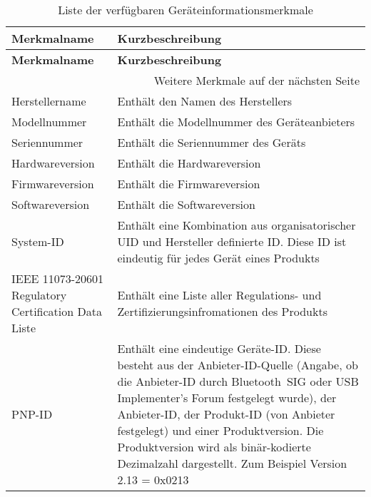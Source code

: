 \begin{longtable}[c]{|p{4cm}|p{11cm}|}
    \caption{Liste der verfügbaren Geräteinformationsmerkmale}
    \label{table:deviceinformationlist}\\
    \hline
    \textbf{Merkmalname} & \textbf{Kurzbeschreibung}\\
    \hline
    \hline
    \endfirsthead

    \hline
    \textbf{Merkmalname} & \textbf{Kurzbeschreibung}\\
    \hline
    \hline
    \endhead

    \hline
    \multicolumn{2}{|r|}{Weitere Merkmale auf der nächsten Seite}\\
    \hline
    \endfoot

    \hline
    \endlastfoot
    
    Herstellername & Enthält den Namen des Herstellers \cite[S.~8]{bluetoothDeviceI}\\
    \hline
    Modellnummer & Enthält die Modellnummer des Geräteanbieters \cite[S.~8]{bluetoothDeviceI}\\
    \hline
    Seriennummer & Enthält die Seriennummer des Geräts \cite[S.~8]{bluetoothDeviceI}\\
    \hline
    Hardwareversion & Enthält die Hardwareversion \cite[S.~9]{bluetoothDeviceI}\\
    \hline
    Firmwareversion & Enthält die Firmwareversion \cite[S.~9]{bluetoothDeviceI}\\
    \hline
    Softwareversion & Enthält die Softwareversion \cite[S.~9]{bluetoothDeviceI}\\
    \hline
    System-ID & Enthält eine Kombination aus organisatorischer UID und Hersteller definierte ID. Diese ID ist eindeutig für jedes Gerät eines Produkts \cite[S.~9]{bluetoothDeviceI}\\
    \hline
    IEEE 11073-20601 Regulatory Certification Data Liste & Enthält eine Liste aller Regulations- und Zertifizierungsinfromationen des Produkts \cite[S.~9]{bluetoothDeviceI}\\
    \hline
    PNP-ID & Enthält eine eindeutige Geräte-ID. Diese besteht aus der Anbieter-ID-Quelle (Angabe, ob die Anbieter-ID durch Bluetooth~SIG oder USB Implementer's Forum festgelegt wurde), der Anbieter-ID, der Produkt-ID (von Anbieter festgelegt) und einer Produktversion. Die Produktversion wird als binär-kodierte Dezimalzahl dargestellt. Zum Beispiel Version 2.13 = 0x0213 \cite[S.~10f.]{bluetoothDeviceI}\\
\end{longtable}

